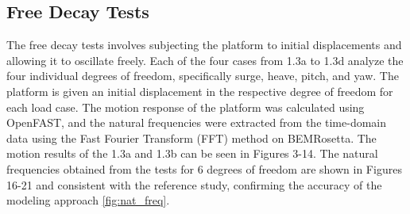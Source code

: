 \documentclass[a4paper, 11pt]{article}
\begin{document}
\subsection{Free Decay Tests}
\hspace*{0.5cm}The free decay tests involves subjecting the platform to initial displacements and allowing it to oscillate freely. Each of the four cases from 1.3a to 1.3d analyze the four individual degrees of freedom, specifically surge, heave, pitch, and yaw. The platform is given an initial displacement in the respective degree of freedom for each load case. The motion response of the platform was calculated using OpenFAST, and the natural frequencies were extracted from the time-domain data using the Fast Fourier Transform (FFT) method on BEMRosetta. The motion results of the 1.3a and 1.3b can be seen in Figures 3-14. The natural frequencies obtained from the tests for 6 degrees of freedom are shown in Figures 16-21 and consistent with the reference study, confirming the accuracy of the modeling approach \autoref{fig:nat_freq}.
\vspace{0.3cm}
\end{document}
